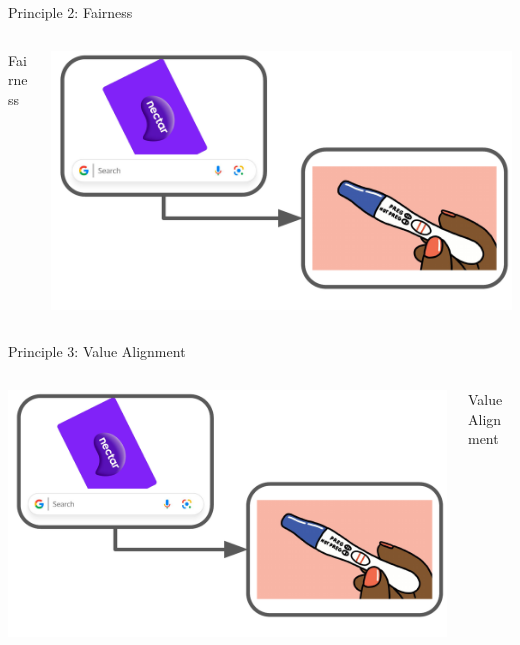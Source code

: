 \begin{frame}{Principle 2: Fairness}
\begin{columns}
    \begin{column}{0.3 \textwidth}
    Fairness
    \end{column}
    \begin{column}{0.7 \textwidth}
     \includegraphics[width = \textwidth, page = 4]{images/RSS_pictures.pdf}
    \end{column}
\end{columns}
\end{frame}

\begin{frame}{Principle 3: Value Alignment}
\begin{columns}
    \begin{column}{0.67 \textwidth}
     \includegraphics[width = \textwidth, page = 5]{images/RSS_pictures.pdf}
    \end{column}
    \begin{column}{0.32 \textwidth}
    Value Alignment
    \end{column}
\end{columns}
\end{frame}

